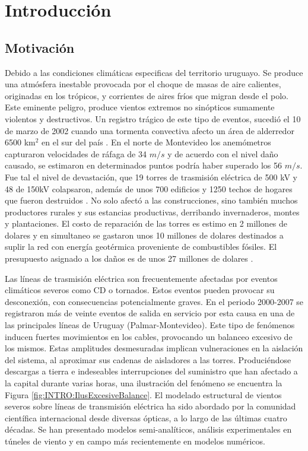 \chapter{Introducción}\label{Cap:Introduccion}
 
\section{Motivación}
\linenumbers

Debido a las condiciones climáticas especificas del territorio uruguayo. Se produce una atmósfera inestable provocada por el choque de masas de aire calientes, originadas en los trópicos, y corrientes de aires fríos que migran desde el polo. Este eminente peligro, produce vientos extremos no sinópticos sumamente violentos y destructivos. Un registro trágico de este tipo de eventos, sucedió el 10 de marzo de 2002 cuando una tormenta convectiva afecto un área de alderredor 6500 km$^2$ en el sur del país \cite{tormenta2002}. En el norte de Montevideo los anemómetros capturaron velocidades de ráfaga de 34 $m/s$ y de acuerdo con el nivel daño causado, se estimaron en determinados puntos podría haber superado los 56 $m/s$. Fue tal el nivel de devastación, que 19 torres de trasmisión eléctrica de 500 kV y 48 de 150kV colapsaron, además de unos 700 edificios y 1250 techos de hogares que fueron destruidos \citep{duranona2015significance}. No solo afectó a las construcciones, sino también muchos productores rurales y sus estancias productivas, derribando invernaderos, montes y plantaciones. El costo de reparación de las torres es estimo en 2 millones de dolares y en simultaneo se gastaron unos 10 millones de dolares destinados a suplir la red con energía geotérmica proveniente de combustibles fósiles. El presupuesto asignado a los daños es de unos 27 millones de dolares \cite{duranona2019first}.

Las líneas de trasmisión eléctrica son frecuentemente afectadas por eventos climáticos severos como \gls{CD} o tornados. Estos eventos pueden provocar su desconexión, con consecuencias potencialmente graves. En el periodo 2000-2007 se registraron más de veinte eventos de salida en servicio por esta causa en una de las principales líneas de Uruguay (Palmar-Montevideo). Este tipo de fenómenos inducen fuertes movimientos en los cables, provocando un balanceo excesivo de los mismos. Estas amplitudes desmesuradas implican vulneraciones en la aislación del sistema, al aproximar sus cadenas de aisladores a las torres. Produciéndose descargas a tierra e indeseables interrupciones del suministro que han afectado a la capital durante varias horas, una ilustración del fenómeno se encuentra la Figura \ref{fig:INTRO:IlusExcesiveBalance}. El modelado estructural de vientos severos sobre líneas de transmisión eléctrica ha sido abordado por la comunidad científica internacional desde diversas ópticas, a lo largo de las últimas cuatro décadas. Se han presentado modelos semi-analíticos, análisis experimentales en túneles de viento y en campo más recientemente en modelos numéricos.
 
